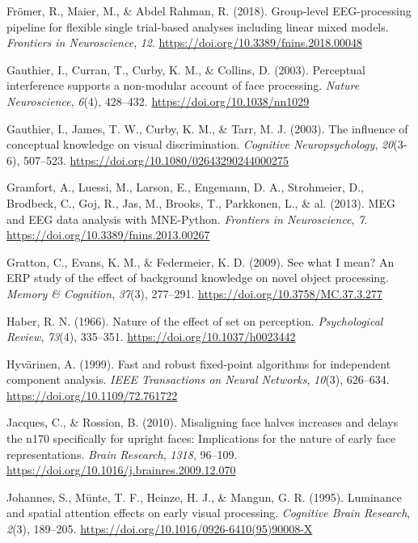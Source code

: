 \documentclass[
  english,
  man,11pt,floatsintext]{apa7}
\begin{document}
\leavevmode\hypertarget{ref-fruxf6mer2018}{}%
Frömer, R., Maier, M., \& Abdel Rahman, R. (2018). Group-level EEG-processing pipeline for flexible single trial-based analyses including linear mixed models. \emph{Frontiers in Neuroscience}, \emph{12}. \url{https://doi.org/10.3389/fnins.2018.00048}

\leavevmode\hypertarget{ref-gauthier2003a}{}%
Gauthier, I., Curran, T., Curby, K. M., \& Collins, D. (2003). Perceptual interference supports a non-modular account of face processing. \emph{Nature Neuroscience}, \emph{6}(4), 428--432. \url{https://doi.org/10.1038/nn1029}

\leavevmode\hypertarget{ref-gauthier2003}{}%
Gauthier, I., James, T. W., Curby, K. M., \& Tarr, M. J. (2003). The influence of conceptual knowledge on visual discrimination. \emph{Cognitive Neuropsychology}, \emph{20}(3-6), 507--523. \url{https://doi.org/10.1080/02643290244000275}

\leavevmode\hypertarget{ref-gramfort2013}{}%
Gramfort, A., Luessi, M., Larson, E., Engemann, D. A., Strohmeier, D., Brodbeck, C., Goj, R., Jas, M., Brooks, T., Parkkonen, L., \& al. (2013). MEG and EEG data analysis with MNE-Python. \emph{Frontiers in Neuroscience}, \emph{7}. \url{https://doi.org/10.3389/fnins.2013.00267}

\leavevmode\hypertarget{ref-gratton2009}{}%
Gratton, C., Evans, K. M., \& Federmeier, K. D. (2009). See what I mean? An ERP study of the effect of background knowledge on novel object processing. \emph{Memory \& Cognition}, \emph{37}(3), 277--291. \url{https://doi.org/10.3758/MC.37.3.277}

\leavevmode\hypertarget{ref-haber1966}{}%
Haber, R. N. (1966). Nature of the effect of set on perception. \emph{Psychological Review}, \emph{73}(4), 335--351. \url{https://doi.org/10.1037/h0023442}

\leavevmode\hypertarget{ref-hyvuxe4rinen1999}{}%
Hyvärinen, A. (1999). Fast and robust fixed-point algorithms for independent component analysis. \emph{IEEE Transactions on Neural Networks}, \emph{10}(3), 626--634. \url{https://doi.org/10.1109/72.761722}

\leavevmode\hypertarget{ref-jacques2010}{}%
Jacques, C., \& Rossion, B. (2010). Misaligning face halves increases and delays the n170 specifically for upright faces: Implications for the nature of early face representations. \emph{Brain Research}, \emph{1318}, 96--109. \url{https://doi.org/10.1016/j.brainres.2009.12.070}

\leavevmode\hypertarget{ref-johannes1995}{}%
Johannes, S., Münte, T. F., Heinze, H. J., \& Mangun, G. R. (1995). Luminance and spatial attention effects on early visual processing. \emph{Cognitive Brain Research}, \emph{2}(3), 189--205. \url{https://doi.org/10.1016/0926-6410(95)90008-X}
\end{document}
